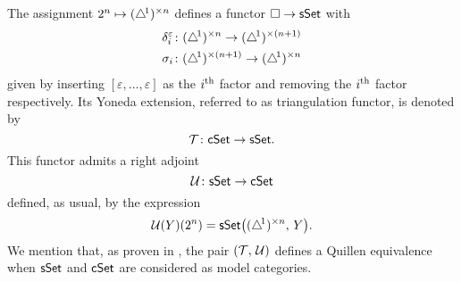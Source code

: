The assignment $2^n \mapsto (\triangle^{\!1})^{\times n}$ defines a functor $\square \to \mathsf{sSet}$ with
\begin{align*}
	&\delta_i^\varepsilon \colon (\triangle^{\!1})^{\times n} \to (\triangle^{\!1})^{\times (n+1)} \\
	&\sigma_i \colon (\triangle^{\!1})^{\times (n+1)} \to (\triangle^{\!1})^{\times n}
\end{align*}
given by inserting $[\varepsilon, \dots, \varepsilon]$ as the $i^{\mathrm{th}}$ factor and removing the $i^{\mathrm{th}}$ factor respectively.
Its Yoneda extension, referred to as triangulation functor, is denoted by
\[
\operatorname{\mathcal{T}} \colon \mathsf{cSet} \to \mathsf{sSet}.
\]
This functor admits a right adjoint
\[
\operatorname{\mathcal{U}} \colon \mathsf{sSet} \to \mathsf{cSet}
\]
defined, as usual, by the expression
\[
\operatorname{\mathcal{U}}(Y)(2^n) = \mathsf{sSet} \big( (\triangle^{\!1})^{\times n}, \, Y \big).
\]
We mention that, as proven in \cite[\S~8.4.30]{cisinski2006presheaves}, the pair $(\operatorname{\mathcal{T}},\, \operatorname{\mathcal{U}})$ defines a Quillen equivalence when $\mathsf{sSet}$ and $\mathsf{cSet}$ are considered as model categories.

%
%
%
%

%

